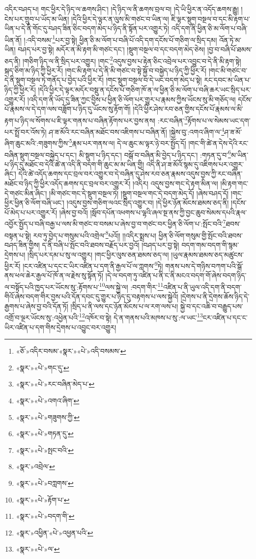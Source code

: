 འདིར་བཤད་པ། གང་ཕྱིར་དེ་ཉིད་ལ་ཆགས་ཤིང་། །དེ་ཉིད་ལ་ནི་ཆགས་བྲལ་བ། །དེ་ཡི་ཕྱིར་ན་འདོད་ཆགས་རྒྱུ། །ངེས་པར་གྲུབ་པ་ཡོད་མ་ཡིན། །དེའི་ཕྱིར་དེ་ལྟར་ན་ལུས་མི་གཙང་བ་ཡིན་ལ། ཇི་ལྟར་སྡུག་བསྔལ་བ་དང་མི་རྟག་པ་ཡིན་པ་དེ་ནི་གོང་དུ་བཤད་ཟིན་ཅིང་བདག་མེད་པ་ཉིད་ནི་སྟོན་པར་འགྱུར་ཏེ། འདི་དག་ནི་ཕྱིན་ཅི་མ་ལོག་པ་བཞི་ཡིན་ནོ། །:འདི་བསམ་\footnote{«ཅོ་»འདིར་བསམ་«སྣར་»«པེ་»འདི་བསམས་}པར་བྱ་སྟེ། ཕྱིན་ཅི་མ་ལོག་པ་བཞི་པོ་འདི་དག་དངོས་པོ་གཅིག་ལ་སྲིད་དམ། འོན་ཏེ་མ་ཡིན། བཤད་པར་བྱ་སྟེ། མདོར་ན་མི་རྟག་མི་གཙང་དང་། །སྡུག་བསྔལ་བ་དང་བདག་མེད་ཅེས། །བྱ་བ་བཞི་པོ་ཐམས་ཅད་ནི། །གཅིག་ཉིད་ལ་ནི་སྲིད་པར་འགྱུར། །གང་\footnote{«སྣར་»«པེ་»གང་དུ་}འདུས་བྱས་པ་རྟེན་ཅིང་འབྲེལ་པར་འབྱུང་བ་དེ་ནི་མི་རྟག་སྟེ། སྐད་ཅིག་མ་ཉིད་ཀྱི་ཕྱིར་རོ། །གང་མི་རྟག་པ་དེ་ནི་མི་གཙང་བ་སྟེ་སྐྱོ་བ་བསྐྱེད་པ་ཉིད་ཀྱི་ཕྱིར་རོ། །གང་མི་གཙང་བ་དེ་ནི་སྡུག་བསྔལ་ཏེ་གནོད་པ་བྱེད་པའི་ཕྱིར་རོ། །གང་སྡུག་བསྔལ་བ་དེ་ཡང་བདག་མེད་པ་སྟེ། རང་དབང་མ་ཡིན་པ་ཉིད་ཀྱི་ཕྱིར་རོ། །དེའི་ཕྱིར་དེ་ལྟར་མདོར་བསྡུ་ན་དངོས་པོ་གཅིག་ཁོ་ན་ལ་ཕྱིན་ཅི་མ་ལོག་པ་བཞི་ཆར་ཡང་སྲིད་པར་འགྱུར་རོ། །འདི་དག་ནི་ཡོད་དུ་ཟིན་ཀྱང་བྱིས་པ་ཕྱིན་ཅི་ལོག་པར་གྱུར་པ་རྣམས་ཀྱིས་ཡོངས་སུ་མི་གཅོད་ལ། དངོས་པོ་རྣམས་ལ་དེ་དག་ལས་བཟློག་པ་ཉིད་དུ་ཡོངས་སུ་རྟོག་གོ། །དེའི་ཕྱིར་ཤེས་རབ་ཅན་གྱིས་དངོས་པོ་རྣམས་ལ་མི་རྟག་པ་ཉིད་ལ་སོགས་པ་ཇི་ལྟར་གནས་པ་བཞིན་རྟོགས་པར་བྱས་ནས། :རང་བཞིན་\footnote{«སྣར་»«པེ་»རང་བཞིན་མེད་པ་}རྟོགས་པ་ལ་སེམས་ཡང་དག་པར་སྤྲོ་བར་འོས་ཏེ། ཤ་ཟ་མོའི་རང་བཞིན་མཐོང་བས་འཇིགས་པ་བཞིན་ནོ། །སྐྱེས་བུ་:འགའ་ཞིག་ལ་\footnote{«སྣར་»«པེ་»འགའ་ཞིག་}ཤ་ཟ་མོ་ཞིག་ཆུང་མའི་:གཟུགས་ཀྱིས་\footnote{«སྣར་»«པེ་»གཟུགས་ཀྱི་}རྣམ་པར་གནས་ལ། དེ་ལ་ཆུང་མ་ལྟར་ཉེ་བར་སྤྱོད་དོ། །གང་གི་ཚེ་ན་དེས་དེའི་རང་བཞིན་སྡུག་བསྔལ་བསྐྱེད་པ་དང་། མི་སྡུག་པ་ཉིད་དང་། བསྒོ་བ་བཞིན་མི་བྱེད་པ་ཉིད་དང་། :གཏན་དུ་བ་\footnote{«སྣར་»«པེ་»གཏན་དུ་}མ་ཡིན་པ་ཉིད་དུ་མཐོང་བ་དེའི་ཚེ་ན་འདི་ནི་བདག་གི་ཆུང་མ་མ་ཡིན་གྱི། འདི་ནི་ཤ་ཟ་མོའོ་སྙམ་དུ་འཇིགས་པར་འགྱུར་ཞིང་། དེའི་ཚེ་འདོད་ཆགས་དང་བྲལ་བར་འགྱུར་བ་དེ་བཞིན་དུ་ཤེས་རབ་ཅན་རྣམས་འདུས་བྱས་ཀྱི་རང་བཞིན་མཐོང་བ་ཉིད་ཀྱི་ཕྱིར་འདོད་ཆགས་དང་བྲལ་བར་འགྱུར་རོ། །འདིར། འདུས་བྱས་གང་དེ་རྟག་མིན་ལ། །མི་རྟག་གང་དེ་གཙང་མིན་ཞིང་། །མི་གཙང་གང་དེ་སྡུག་བསྔལ་ཏེ། །སྡུག་བསྔལ་གང་དེ་བདག་མེད་དོ། །ཞེས་བཤད་དོ། །གང་ཕྱིར་ཕྱིན་ཅི་ལོག་བཞི་ཡང་། །འདུས་བྱས་གཅིག་ལའང་སྲིད་འགྱུར་བ། །དེ་ཕྱིར་ཉོན་མོངས་ཐམས་ཅད་ནི། །དངོས་པོ་མེད་པ་པར་འགྱུར་རོ། །ཞེས་བྱ་བའོ། །སློབ་དཔོན་འཕགས་པ་ལྷའི་ཞལ་སྔ་ནས་ཀྱི་བྱང་ཆུབ་སེམས་དཔའི་རྣལ་འབྱོར་སྤྱོད་པ་བཞི་བརྒྱ་པ་ལས་མི་གཙང་བ་བསམ་པ་ཞེས་བྱ་བ་གཙང་བར་ཕྱིན་ཅི་ལོག་པ་:སྤོང་བའི་\footnote{«སྣར་»«པེ་»སྤང་བའི་}ཐབས་བསྟན་པ་སྟེ། རབ་ཏུ་བྱེད་པ་གསུམ་པའི་འགྲེལ་\footnote{«སྣར་»འབྲེལ་}པའོ།། །།འདིར་སྨྲས་པ། ཕྱིན་ཅི་ལོག་གསུམ་གྱི་སྤོང་བའི་ཐབས་བཤད་ཟིན་གྱིས། ད་ནི་བཞི་པ་སྤོང་བའི་ཐབས་བརྗོད་པར་བྱའོ། །བཤད་པར་བྱ་སྟེ། བདག་གམ་བདག་གི་སྙམ་དྲེགས་པ། །སྲིད་པར་དམ་པ་སུ་ལ་འགྱུར། །གང་ཕྱིར་ལུས་ཅན་ཐམས་ཅད་ལ། །ཡུལ་རྣམས་ཐམས་ཅད་མཚུངས་ཕྱིར་རོ། །ངར་འཛིན་པ་དང་ང་ཡིར་འཛིན་པ་དག་ནི་རྒྱལ་པོ་ལ་ཀླགས་\footnote{«སྣར་»«པེ་»བཀླགས་}ཏེ། གནས་པས་དེ་གཉིས་བཀག་པའི་སྒོ་ནས་ཕལ་ཆེར་རྒྱལ་པོ་ཁོ་ན་ལ་རྗེས་སུ་སྟོན་ཏོ། །དེ་ལ་བདག་ཏུ་འཛིན་པ་ནི་ང་ནི་མངའ་བདག་གོ་ཞེས་བདག་ཉིད་ལ་བསྟོད་པའི་ཁྱད་པར་ཡོངས་སུ་:རྟོགས་པ་\footnote{«སྣར་»«པེ་»རྟོག་པ་}ལས་སྐྱེ་ལ། :བདག་གིར་\footnote{«སྣར་»«པེ་»བདག་གི་}འཛིན་པ་ནི་ཡུལ་འདི་དག་ནི་བདག་གིའོ་ཞེས་བདག་གིར་བྱས་པའི་དོན་དབང་དུ་གྱུར་པ་ཉིད་དུ་བརྟགས་པ་ལས་སྐྱེའོ། །དྲེགས་པ་ནི་དྲེགས་ཆོས་ཉིད་དེ་རྒྱགས་པ་ཞེས་བྱ་བའི་དོན་ཏོ། །སྲིད་པ་ནི་ལས་དང་ཉོན་མོངས་པ་ལ་རག་ལས་པ། སྐྱེ་བ་དང་འཆི་བ་བརྒྱུད་པས་འགྲོ་བ་ལྔར་ཡོངས་སུ་:འཕྱེན་པའི་\footnote{«སྣར་»འཕྱིན་«པེ་»འཕྱན་པའི་}འཁོར་བ་སྟེ། དེ་ན་གནས་པའི་མཁས་པ་སུ་:ལ་ཡང་\footnote{«སྣར་»«པེ་»ལ་}ངར་འཛིན་པ་དང་ང་ཡིར་འཛིན་པ་དག་གིས་དྲེགས་པ་འབྱུང་བར་འགྱུར། 